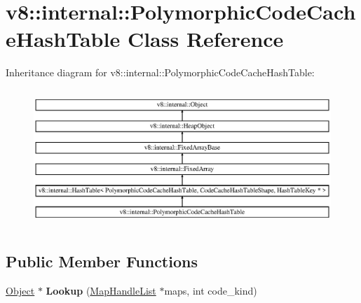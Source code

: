 \hypertarget{classv8_1_1internal_1_1_polymorphic_code_cache_hash_table}{}\section{v8\+:\+:internal\+:\+:Polymorphic\+Code\+Cache\+Hash\+Table Class Reference}
\label{classv8_1_1internal_1_1_polymorphic_code_cache_hash_table}
Inheritance diagram for v8\+:\+:internal\+:\+:Polymorphic\+Code\+Cache\+Hash\+Table\+:\begin{figure}[H]
\begin{center}
\leavevmode
\includegraphics[height=5.217391cm]{classv8_1_1internal_1_1_polymorphic_code_cache_hash_table}
\end{center}
\end{figure}
\subsection*{Public Member Functions}
\begin{DoxyCompactItemize}
\item 
\hypertarget{classv8_1_1internal_1_1_polymorphic_code_cache_hash_table_a02d36b7de148923f8fc4f81511101d9b}{}\hyperlink{classv8_1_1internal_1_1_object}{Object} $\ast$ {\bfseries Lookup} (\hyperlink{classv8_1_1internal_1_1_list}{Map\+Handle\+List} $\ast$maps, int code\+\_\+kind)\label{classv8_1_1internal_1_1_polymorphic_code_cache_hash_table_a02d36b7de148923f8fc4f81511101d9b}

\end{DoxyCompactItemize}

